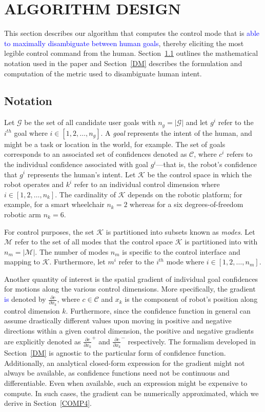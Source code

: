 \documentclass[conference]{IEEEtran}
\begin{document}
\section{ALGORITHM DESIGN} \label{ALGO}
This section describes our algorithm that computes the control mode that is \textcolor{blue}{able to maximally disambiguate between human goals}, thereby eliciting the most legible control command from the human. Section~\ref{NOT} outlines the mathematical notation used in the paper and Section~\ref{DM} describes the formulation and computation of the metric used to disambiguate human intent. 

\subsection{Notation}\label{NOT}

Let $\mathcal{G}$ be the set of all candidate user goals with $n_g = \vert\mathcal{G}\vert$ and let $g^{i}$ refer to the $i^{th}$ goal where $i \in [1,2,\dots,n_g]$. A \textit{goal} represents the intent of the human, and might be a task or location in the world, for example. The set of goals corresponds to an associated set of confidences denoted as $\mathcal{C}$, where $c^{i}$ refers to the individual confidence associated with goal $g^{i}$---that is, the robot's confidence that $g^{i}$ represents the human's intent. Let $\mathcal{K}$ be the control space in which the robot operates and $k^{i}$ refer to an individual control dimension where $i \in [1,2,\dots,n_k]$.  The cardinality of $\mathcal{K}$ depends on the robotic platform; for example, for a smart wheelchair $n_k = 2$ whereas for a six degrees-of-freedom robotic arm $n_k = 6$.

For control purposes, the set $\mathcal{K}$ is partitioned into subsets known as \textit{modes}. Let $\mathcal{M}$ refer to the set of all modes that the control space $\mathcal{K}$ is partitioned into with $n_{m} = \vert\mathcal{M}\vert$. The number of modes $n_{m}$ is specific to the control interface and mapping to $\mathcal{K}$. Furthermore, let $m^{i}$ refer to the $i^{th}$ mode where $i \in [1,2,\dots,n_{m}]$.

Another quantity of interest is the spatial gradient of individual goal confidences for motions along the various control dimensions. More specifically, the gradient \textcolor{blue}{is} denoted by $\frac{\partial c}{\partial x_k}$, where $c \in \mathcal{C}$ and $x_k$ is the component of robot's position along control dimension $k$. Furthermore, since the confidence function in general can assume drastically different values upon moving in positive and negative directions within a given control dimension, the positive and negative gradients are explicitly denoted as $\frac{\partial c}{\partial x_k}^{+}$ and $\frac{\partial c}{\partial x_k}^{-}$ respectively. The formalism developed in Section~\ref{DM} is agnostic to the particular form of confidence function. Additionally, an analytical closed-form expression for the gradient might not always be available, as confidence functions need not be continuous and differentiable. Even when available, such an expression might be expensive to compute. In such cases, the gradient can be numerically approximated, which we derive in Section~\ref{COMP4}.
\end{document}
